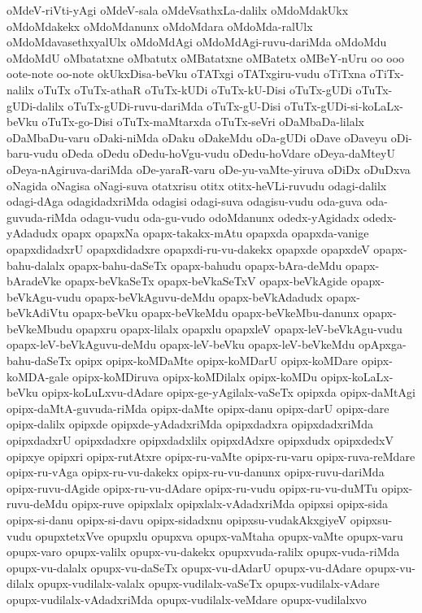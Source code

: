 {oMdeV-riVti-yAgi
oMdeV-sala
oMdeVsathxLa-dalilx
oMdoMdakUkx
oMdoMdakekx
oMdoMdanunx
oMdoMdara
oMdoMda-ralUlx
oMdoMdavasethxyalUlx
oMdoMdAgi
oMdoMdAgi-ruvu-dariMda
oMdoMdu
oMdoMdU
oMbatatxne
oMbatutx
oMBatatxne
oMBatetx
oMBeY-nUru
oo
ooo
oote-note
oo-note
okUkxDisa-beVku
oTATxgi
oTATxgiru-vudu
oTiTxna
oTiTx-nalilx
oTuTx
oTuTx-athaR
oTuTx-kUDi
oTuTx-kU-Disi
oTuTx-gUDi
oTuTx-gUDi-dalilx
oTuTx-gUDi-ruvu-dariMda
oTuTx-gU-Disi
oTuTx-gUDi-si-koLaLx-beVku
oTuTx-go-Disi
oTuTx-maMtarxda
oTuTx-seVri
oDaMbaDa-lilalx
oDaMbaDu-varu
oDaki-niMda
oDaku
oDakeMdu
oDa-gUDi
oDave
oDaveyu
oDi-baru-vudu
oDeda
oDedu
oDedu-hoVgu-vudu
oDedu-hoVdare
oDeya-daMteyU
oDeya-nAgiruva-dariMda
oDe-yaraR-varu
oDe-yu-vaMte-yiruva
oDiDx
oDuDxva
oNagida
oNagisa
oNagi-suva
otatxrisu
otitx
otitx-heVLi-ruvudu
odagi-dalilx
odagi-dAga
odagidadxriMda
odagisi
odagi-suva
odagisu-vudu
oda-guva
oda-guvuda-riMda
odagu-vudu
oda-gu-vudo
odoMdanunx
odedx-yAgidadx
odedx-yAdadudx
opapx
opapxNa
opapx-takakx-mAtu
opapxda
opapxda-vanige
opapxdidadxrU
opapxdidadxre
opapxdi-ru-vu-dakekx
opapxde
opapxdeV
opapx-bahu-dalalx
opapx-bahu-daSeTx
opapx-bahudu
opapx-bAra-deMdu
opapx-bAradeVke
opapx-beVkaSeTx
opapx-beVkaSeTxV
opapx-beVkAgide
opapx-beVkAgu-vudu
opapx-beVkAguvu-deMdu
opapx-beVkAdadudx
opapx-beVkAdiVtu
opapx-beVku
opapx-beVkeMdu
opapx-beVkeMbu-danunx
opapx-beVkeMbudu
opapxru
opapx-lilalx
opapxlu
opapxleV
opapx-leV-beVkAgu-vudu
opapx-leV-beVkAguvu-deMdu
opapx-leV-beVku
opapx-leV-beVkeMdu
opApxga-bahu-daSeTx
opipx
opipx-koMDaMte
opipx-koMDarU
opipx-koMDare
opipx-koMDA-gale
opipx-koMDiruva
opipx-koMDilalx
opipx-koMDu
opipx-koLaLx-beVku
opipx-koLuLxvu-dAdare
opipx-ge-yAgilalx-vaSeTx
opipxda
opipx-daMtAgi
opipx-daMtA-guvuda-riMda
opipx-daMte
opipx-danu
opipx-darU
opipx-dare
opipx-dalilx
opipxde
opipxde-yAdadxriMda
opipxdadxra
opipxdadxriMda
opipxdadxrU
opipxdadxre
opipxdadxlilx
opipxdAdxre
opipxdudx
opipxdedxV
opipxye
opipxri
opipx-rutAtxre
opipx-ru-vaMte
opipx-ru-varu
opipx-ruva-reMdare
opipx-ru-vAga
opipx-ru-vu-dakekx
opipx-ru-vu-danunx
opipx-ruvu-dariMda
opipx-ruvu-dAgide
opipx-ru-vu-dAdare
opipx-ru-vudu
opipx-ru-vu-duMTu
opipx-ruvu-deMdu
opipx-ruve
opipxlalx
opipxlalx-vAdadxriMda
opipxsi
opipx-sida
opipx-si-danu
opipx-si-davu
opipx-sidadxnu
opipxsu-vudakAkxgiyeV
opipxsu-vudu
opupxtetxVve
opupxlu
opupxva
opupx-vaMtaha
opupx-vaMte
opupx-varu
opupx-varo
opupx-valilx
opupx-vu-dakekx
opupxvuda-ralilx
opupx-vuda-riMda
opupx-vu-dalalx
opupx-vu-daSeTx
opupx-vu-dAdarU
opupx-vu-dAdare
opupx-vu-dilalx
opupx-vudilalx-valalx
opupx-vudilalx-vaSeTx
opupx-vudilalx-vAdare
opupx-vudilalx-vAdadxriMda
opupx-vudilalx-veMdare
opupx-vudilalxvo
}
